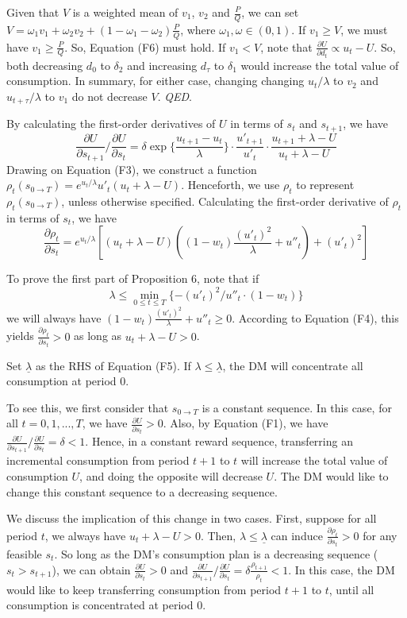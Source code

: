 \documentclass[
  12pt,
]{article}
\begin{document}
Given that \(V\) is a weighted mean of \(v_1\), \(v_2\) and
\(\frac{P}{Q}\), we can set
\(V=\omega_1v_1+\omega_2v_2+(1-\omega_1-\omega_2)\frac{P}{Q}\), where
\(\omega_1,\omega\in(0,1)\). If \(v_1\geq V\), we must have
\(v_1\geq \frac{P}{Q}\). So, Equation (F6) must hold. If \(v_1<V\), note
that \(\frac{\partial U}{\partial d_t}\propto u_t-U\). So, both
decreasing \(d_0\) to \(\delta_2\) and increasing \(d_\tau\) to
\(\delta_1\) would increase the total value of consumption. In summary,
for either case, changing changing \(u_t/\lambda\) to \(v_2\) and
\(u_{t+\tau}/\lambda\) to \(v_1\) do not decrease \(V\). \emph{QED}.

By calculating the first-order derivatives of \(U\) in terms of \(s_t\)
and \(s_{t+1}\), we have\[\tag{F3}
\frac{\partial U}{\partial s_{t+1}}/\frac{\partial U}{\partial s_t} = 
\delta \exp\{\frac{u_{t+1}-u_t}{\lambda}\}
\cdot\frac{u'_{t+1}}{u'_t}
\cdot\frac{u_{t+1}+\lambda-U}{u_t+\lambda-U}
\]Drawing on Equation (F3), we construct a function
\(\rho_t(s_{0\rightarrow T})=e^{u_t/\lambda}u'_t(u_t+\lambda-U)\).
Henceforth, we use \(\rho_t\) to represent
\(\rho_t(s_{0\rightarrow T})\), unless otherwise specified. Calculating
the first-order derivative of \(\rho_t\) in terms of \(s_t\), we
have\[\tag{F4}
\frac{\partial \rho_t}{\partial s_t} = 
e^{u_t/\lambda}[
(u_t+\lambda-U)((1-w_t)\frac{(u'_t)^2}{\lambda}+u''_t)
+(u'_t)^2]
\]

To prove the first part of Proposition 6, note that if\[\tag{F5}
\lambda\leq \min_{0 \leq t \leq T} \{-(u'_t)^2/u''_t \cdot(1-w_t)\}
\]we will always have \((1-w_t)\frac{(u'_t)^2}{\lambda}+u''_t \geq 0\).
According to Equation (F4), this yields
\(\frac{\partial \rho_t}{\partial s_t}>0\) as long as
\(u_t+\lambda-U>0\).

Set \(\underline{\lambda}\) as the RHS of Equation (F5). If
\(\lambda\leq \underline{\lambda}\), the DM will concentrate all
consumption at period 0.

To see this, we first consider that \(s_{0\rightarrow T}\) is a constant
sequence. In this case, for all \(t=0,1,...,T\), we have
\(\frac{\partial U}{\partial s_t}>0\). Also, by Equation (F1), we have
\(\frac{\partial U}{\partial s_{t+1}}/\frac{\partial U}{\partial s_{t}}=\delta<1\).
Hence, in a constant reward sequence, transferring an incremental
consumption from period \(t+1\) to \(t\) will increase the total value
of consumption \(U\), and doing the opposite will decrease \(U\). The DM
would like to change this constant sequence to a decreasing sequence.

We discuss the implication of this change in two cases. First, suppose
for all period \(t\), we always have \(u_t+\lambda-U>0\). Then,
\(\lambda \leq \underline{\lambda}\) can induce
\(\frac{\partial \rho_t}{\partial s_t}>0\) for any feasible \(s_t\). So
long as the DM's consumption plan is a decreasing sequence
(\(s_t>s_{t+1}\)), we can obtain \(\frac{\partial U}{\partial s_t}>0\)
and
\(\frac{\partial U}{\partial s_{t+1}}/\frac{\partial U}{\partial s_{t}}=\delta\frac{\rho_{t+1}}{\rho_{t}}<1\).
In this case, the DM would like to keep transferring consumption from
period \(t+1\) to \(t\), until all consumption is concentrated at period
0.
\end{document}
